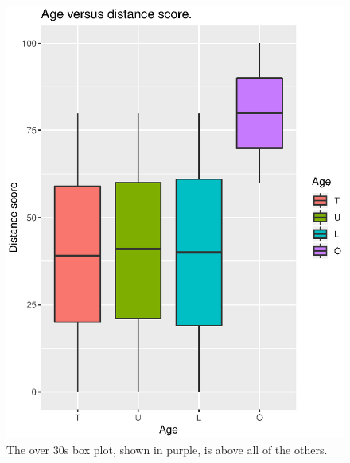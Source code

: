 \documentclass[runningheads]{llncs}
\begin{document}
\begin{figure}[h!]
\begin{multicols}{2}
    \includegraphics[width=\linewidth]{AgeDist.eps} \vspace{-0.7cm} \caption{The over 30s box plot, shown in purple, is above all of the others.} \label{ageDist} \par
\end{multicols}   
\begin{multicols}{2}

\end{multicols}
\end{figure}
\end{document}
